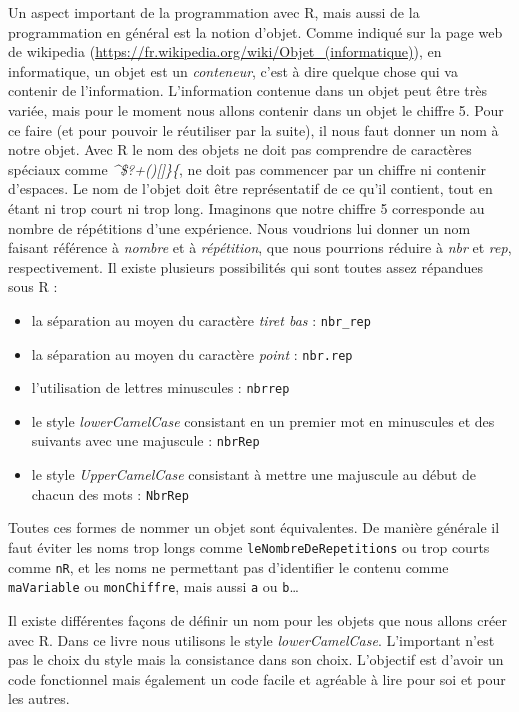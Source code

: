 \documentclass[
]{book}
\providecommand{\tightlist}{%
  \setlength{\itemsep}{0pt}\setlength{\parskip}{0pt}}
\begin{document}
Un aspect important de la programmation avec R, mais aussi de la programmation en général est la notion d'objet. Comme indiqué sur la page web de wikipedia (\url{https://fr.wikipedia.org/wiki/Objet_(informatique)}), en informatique, un objet est un \emph{conteneur}, c'est à dire quelque chose qui va contenir de l'information. L'information contenue dans un objet peut être très variée, mais pour le moment nous allons contenir dans un objet le chiffre 5. Pour ce faire (et pour pouvoir le réutiliser par la suite), il nous faut donner un nom à notre objet. Avec R le nom des objets ne doit pas comprendre de caractères spéciaux comme \emph{\^{}\$?\textbar+(){[}{]}\}\{}, ne doit pas commencer par un chiffre ni contenir d'espaces. Le nom de l'objet doit être représentatif de ce qu'il contient, tout en étant ni trop court ni trop long. Imaginons que notre chiffre 5 corresponde au nombre de répétitions d'une expérience. Nous voudrions lui donner un nom faisant référence à \emph{nombre} et à \emph{répétition}, que nous pourrions réduire à \emph{nbr} et \emph{rep}, respectivement. Il existe plusieurs possibilités qui sont toutes assez répandues sous R :

\begin{itemize}
\tightlist
\item
  la séparation au moyen du caractère \emph{tiret bas} : \texttt{nbr\_rep}
\item
  la séparation au moyen du caractère \emph{point} : \texttt{nbr.rep}
\item
  l'utilisation de lettres minuscules : \texttt{nbrrep}
\item
  le style \emph{lowerCamelCase} consistant en un premier mot en minuscules et des suivants avec une majuscule : \texttt{nbrRep}
\item
  le style \emph{UpperCamelCase} consistant à mettre une majuscule au début de chacun des mots : \texttt{NbrRep}
\end{itemize}

Toutes ces formes de nommer un objet sont équivalentes. De manière générale il faut éviter les noms trop longs comme \texttt{leNombreDeRepetitions} ou trop courts comme \texttt{nR}, et les noms ne permettant pas d'identifier le contenu comme \texttt{maVariable} ou \texttt{monChiffre}, mais aussi \texttt{a} ou \texttt{b}\ldots{}

Il existe différentes façons de définir un nom pour les objets que nous allons créer avec R. Dans ce livre nous utilisons le style \emph{lowerCamelCase}. L'important n'est pas le choix du style mais la consistance dans son choix. L'objectif est d'avoir un code fonctionnel mais également un code facile et agréable à lire pour soi et pour les autres.
\end{document}
